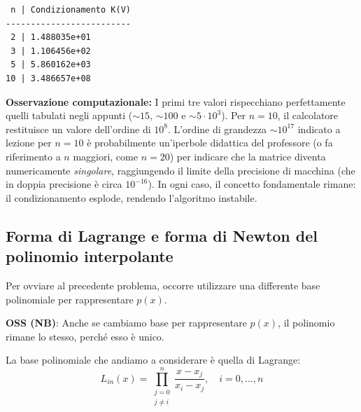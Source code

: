 \begin{verbatim}
 n | Condizionamento K(V)
-------------------------
 2 | 1.488035e+01
 3 | 1.106456e+02
 5 | 5.860162e+03
10 | 3.486657e+08 
\end{verbatim}

\textbf{Osservazione computazionale:} I primi tre valori rispecchiano perfettamente quelli tabulati negli appunti ($\sim 15$, $\sim 100$ e $\sim 5 \cdot 10^3$). Per $n=10$, il calcolatore restituisce un valore dell'ordine di $10^8$. L'ordine di grandezza $\sim 10^{17}$ indicato a lezione per $n=10$ è probabilmente un'iperbole didattica del professore (o fa riferimento a $n$ maggiori, come $n=20$) per indicare che la matrice diventa numericamente \textit{singolare}, raggiungendo il limite della precisione di macchina (che in doppia precisione è circa $10^{-16}$). In ogni caso, il concetto fondamentale rimane: il condizionamento esplode, rendendo l'algoritmo instabile.

\vspace{0.5cm}
\subsection{Forma di Lagrange e forma di Newton del polinomio interpolante}
Per ovviare al precedente problema, occorre utilizzare una differente base polinomiale per rappresentare $p(x)$. 

\textbf{OSS (NB)}: Anche se cambiamo base per rappresentare $p(x)$, il polinomio rimane lo stesso, perché esso è unico.

La base polinomiale che andiamo a considerare è quella di Lagrange:
$$L_{in}(x) = \prod_{\substack{j=0 \\ j \neq i}}^{n} \frac{x - x_j}{x_i - x_j}, \quad i=0,\dots,n$$

